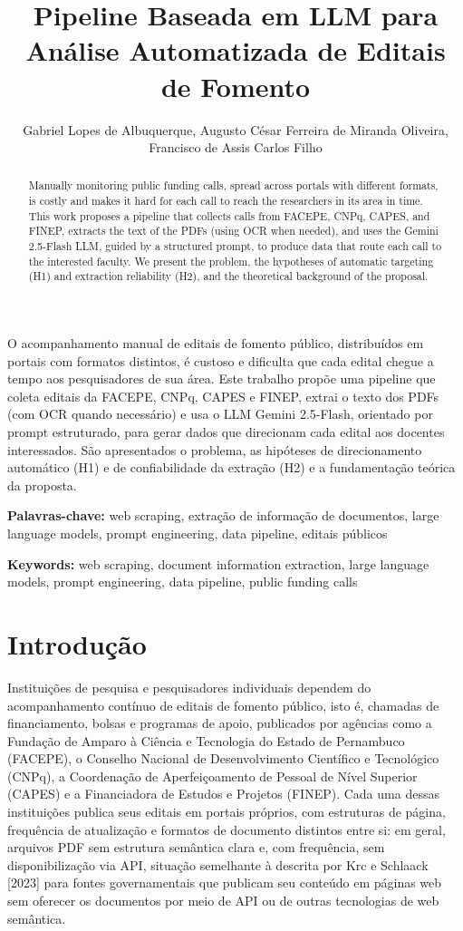\documentclass[12pt]{article}
\title{Pipeline Baseada em LLM para Análise Automatizada de Editais de Fomento}
\author{Gabriel Lopes de Albuquerque, Augusto César Ferreira de Miranda Oliveira,\\ Francisco de Assis Carlos Filho}
\begin{document}
  \maketitle

  \begin{abstract}
    Manually monitoring public funding calls, spread across portals with different formats, is costly and makes it hard for each call to reach the researchers in its area in time. This work proposes a pipeline that collects calls from FACEPE, CNPq, CAPES, and FINEP, extracts the text of the PDFs (using OCR when needed), and uses the Gemini 2.5-Flash LLM, guided by a structured prompt, to produce data that route each call to the interested faculty. We present the problem, the hypotheses of automatic targeting (H1) and extraction reliability (H2), and the theoretical background of the proposal.
  \end{abstract}

  \begin{resumo}
    O acompanhamento manual de editais de fomento público, distribuídos em portais com formatos distintos, é custoso e dificulta que cada edital chegue a tempo aos pesquisadores de sua área. Este trabalho propõe uma pipeline que coleta editais da FACEPE, CNPq, CAPES e FINEP, extrai o texto dos PDFs (com OCR quando necessário) e usa o LLM Gemini 2.5-Flash, orientado por prompt estruturado, para gerar dados que direcionam cada edital aos docentes interessados. São apresentados o problema, as hipóteses de direcionamento automático (H1) e de confiabilidade da extração (H2) e a fundamentação teórica da proposta.
  \end{resumo}

  \noindent\textbf{Palavras-chave:} web scraping, extração de informação de documentos, large language models, prompt engineering, data pipeline, editais públicos

  \noindent\textbf{Keywords:} web scraping, document information extraction, large language models, prompt engineering, data pipeline, public funding calls

  \section{Introdução}

  Instituições de pesquisa e pesquisadores individuais dependem do acompanhamento contínuo de editais de fomento público, isto é, chamadas de financiamento, bolsas e programas de apoio, publicados por agências como a Fundação de Amparo à Ciência e Tecnologia do Estado de Pernambuco (FACEPE), o Conselho Nacional de Desenvolvimento Científico e Tecnológico (CNPq), a Coordenação de Aperfeiçoamento de Pessoal de Nível Superior (CAPES) e a Financiadora de Estudos e Projetos (FINEP). Cada uma dessas instituições publica seus editais em portais próprios, com estruturas de página, frequência de atualização e formatos de documento distintos entre si: em geral, arquivos PDF sem estrutura semântica clara \cite{b4} e, com frequência, sem disponibilização via API, situação semelhante à descrita por Krc e Schlaack [2023] para fontes governamentais que publicam seu conteúdo em páginas web sem oferecer os documentos por meio de API ou de outras tecnologias de web semântica.
\end{document}
